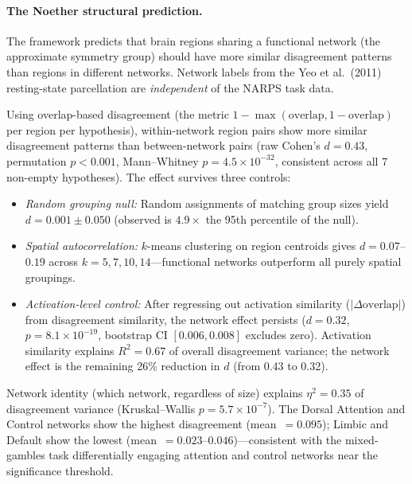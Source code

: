 \documentclass[11pt,a4paper]{article}
\begin{document}
\paragraph{The Noether structural prediction.}
The framework predicts that brain regions sharing a functional network (the approximate symmetry group) should have more similar disagreement patterns than regions in different networks.  Network labels from the Yeo et al.\ (2011) resting-state parcellation are \emph{independent} of the NARPS task data.

Using overlap-based disagreement (the metric $1 - \max(\text{overlap}, 1 - \text{overlap})$ per region per hypothesis), within-network region pairs show more similar disagreement patterns than between-network pairs (raw Cohen's $d = 0.43$, permutation $p < 0.001$, Mann--Whitney $p = 4.5 \times 10^{-32}$, consistent across all 7 non-empty hypotheses).  The effect survives three controls:
\begin{itemize}
  \item \emph{Random grouping null:} Random assignments of matching group sizes yield $d = 0.001 \pm 0.050$ (observed is $4.9\times$ the 95th percentile of the null).
  \item \emph{Spatial autocorrelation:} $k$-means clustering on region centroids gives $d = 0.07$--$0.19$ across $k = 5, 7, 10, 14$---functional networks outperform all purely spatial groupings.
  \item \emph{Activation-level control:} After regressing out activation similarity ($|\Delta\text{overlap}|$) from disagreement similarity, the network effect persists ($d = 0.32$, $p = 8.1 \times 10^{-19}$, bootstrap CI $[0.006, 0.008]$ excludes zero).  Activation similarity explains $R^2 = 0.67$ of overall disagreement variance; the network effect is the remaining 26\% reduction in $d$ (from 0.43 to 0.32).
\end{itemize}

Network identity (which network, regardless of size) explains $\eta^2 = 0.35$ of disagreement variance (Kruskal--Wallis $p = 5.7 \times 10^{-7}$).  The Dorsal Attention and Control networks show the highest disagreement (mean~$= 0.095$); Limbic and Default show the lowest (mean~$= 0.023$--$0.046$)---consistent with the mixed-gambles task differentially engaging attention and control networks near the significance threshold.
\end{document}
